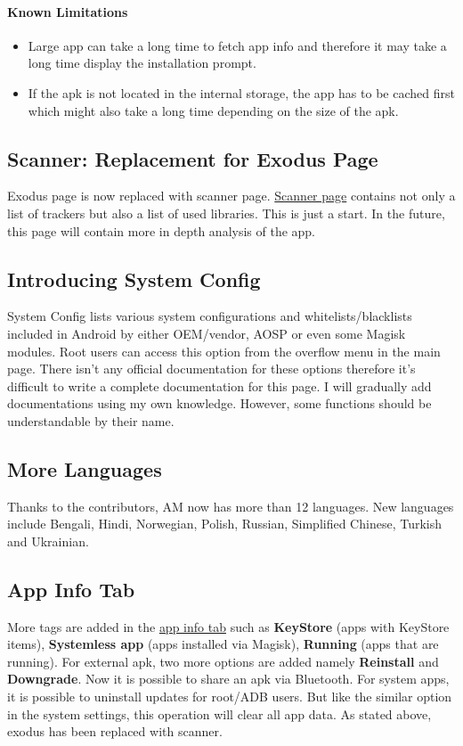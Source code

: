 \paragraph{Known Limitations}
\begin{itemize}
    \item Large app can take a long time to fetch app info and therefore it may take a long time display the installation prompt.
    \item If the apk is not located in the internal storage, the app has to be cached first which might also take
    a long time depending on the size of the apk.
\end{itemize}

\subsection{Scanner: Replacement for Exodus Page}
Exodus page is now replaced with scanner page. \hyperref[sec:scanner-page]{Scanner page} contains not only a list of
trackers but also a list of used libraries. This is just a start. In the future, this page will contain more in depth
analysis of the app.

\subsection{Introducing System Config}
System Config lists various system configurations and whitelists/blacklists included in Android by either OEM/vendor,
AOSP or even some Magisk modules. Root users can access this option from the overflow menu in the main page.
There isn't any official documentation for these options therefore it's difficult to write a complete documentation
for this page. I will gradually add documentations using my own knowledge. However, some functions should be
understandable by their name.

\subsection{More Languages}
Thanks to the contributors, AM now has more than 12 languages. New languages include Bengali, Hindi, Norwegian, Polish,
Russian, Simplified Chinese, Turkish and Ukrainian.

\subsection{App Info Tab}
More tags are added in the \hyperref[subsec:app-info-tab]{app info tab} such as \textbf{KeyStore} (apps with KeyStore
items), \textbf{Systemless app} (apps installed via Magisk), \textbf{Running} (apps that are running). For external apk,
two more options are added namely \textbf{Reinstall} and \textbf{Downgrade}. Now it is possible to share an apk via
Bluetooth. For system apps, it is possible to uninstall updates for root/ADB users. But like the similar option in the
system settings, this operation will clear all app data. As stated above, exodus has been replaced with scanner.

